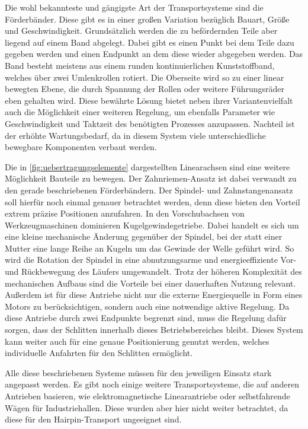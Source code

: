 Die wohl bekannteste und gängigste Art der Transportsysteme sind die Förderbänder. Diese gibt es in einer großen Variation bezüglich
Bauart, Größe und Geschwindigkeit. Grundsätzlich werden die zu befördernden Teile aber liegend auf einem Band abgelegt.
Dabei gibt es einen Punkt bei dem Teile dazu gegeben werden und einen Endpunkt an dem diese wieder abgegeben werden. Das Band besteht
meistens aus einem runden kontinuierlichen Kunststoffband, welches über zwei Umlenkrollen rotiert. Die Oberseite wird so zu einer
linear bewegten Ebene, die durch Spannung der Rollen oder weitere Führungsräder eben gehalten wird. Diese bewährte Lösung bietet
neben ihrer Variantenvielfalt auch die Möglichkeit einer weiteren Regelung, um ebenfalls Parameter wie Geschwindigkeit und Taktzeit
des benötigten Prozesses anzupassen. Nachteil ist der erhöhte Wartungsbedarf, da in diesem System viele unterschiedliche bewegbare Komponenten
verbaut werden.

Die in \cref{fig:uebertragungselemente} dargestellten Linearachsen sind eine weitere Möglichkeit Bauteile zu bewegen. Der Zahnriemen-Ansatz
ist dabei verwandt zu den gerade beschriebenen Förderbändern. Der Spindel- und Zahnstangenansatz soll hierfür noch einmal genauer
betrachtet werden, denn diese bieten den Vorteil extrem präzise Positionen anzufahren. In den Vorschubachsen von Werkzeugmaschinen 
dominieren Kugelgewindegetriebe. Dabei handelt es sich um eine kleine mechanische Änderung gegenüber der Spindel, bei der statt einer Mutter
eine lange Reihe an Kugeln um das Gewinde der Welle geführt wird. So wird die Rotation der Spindel in eine abnutzungsarme und energieeffiziente
Vor- und Rückbewegung des Läufers umgewandelt. Trotz der höheren Komplexität des mechanischen Aufbaus sind die Vorteile bei einer
dauerhaften Nutzung relevant. Außerdem ist für diese Antriebe nicht nur die externe Energiequelle in Form eines Motors zu berücksichtigen,
sondern auch eine notwendige aktive Regelung. Da diese Antriebe durch zwei Endpunkte begrenzt sind, muss die Regelung dafür sorgen,
dass der Schlitten innerhalb dieses Betriebsbereiches bleibt. Dieses System kann weiter auch für eine genaue Positionierung genutzt werden,
welches individuelle Anfahrten für den Schlitten ermöglicht.

Alle diese beschriebenen Systeme müssen für den jeweiligen Einsatz stark angepasst werden. Es gibt noch einige weitere Transportsysteme,
die auf anderen Antrieben basieren, wie elektromagnetische Linearantriebe oder selbstfahrende Wägen für Industriehallen. Diese wurden aber
hier nicht weiter betrachtet, da diese für den Hairpin-Transport ungeeignet sind.
%
